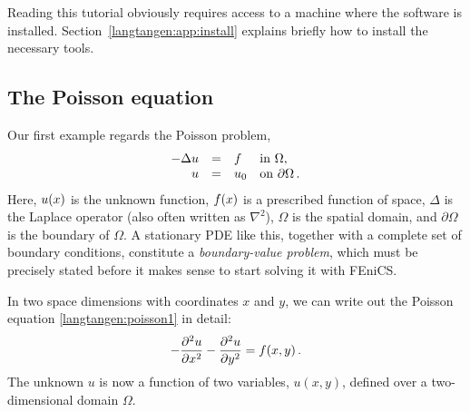 
Reading this tutorial obviously requires access to a machine where the
\fenics{} software
is installed. Section~\ref{langtangen:app:install} explains briefly how
to install the necessary tools.

\subsection{The Poisson equation}
\label{langtangen:poisson1:bvp}

Our first example regards the Poisson problem,
\begin{equation} \label{langtangen:poisson1}
  \begin{array}{rcll}
    - \Delta u &=& f &\mbox{in } \Omega, \\
    u &=& u_0 &\mbox{on } \partial \Omega\thinspace .
  \end{array}
\end{equation}
Here, $u({x})$ is the unknown function, $f({x})$ is a prescribed function
of space, $\Delta$  is the Laplace operator (also often written
as $\nabla^2$), $\Omega$ is the spatial domain, and $\partial\Omega$ is
the boundary of $\Omega$. A stationary PDE like this, together with a
complete set of boundary conditions, constitute a
\emph{boundary-value problem}, which must be precisely stated before
it makes sense to start solving it with FEniCS.

In two space dimensions
with coordinates $x$ and $y$, we can write out the Poisson equation
\eqref{langtangen:poisson1}
in detail:
\begin{equation}
- {\partial^2 u\over\partial x^2} -
{\partial^2 u\over\partial y^2} = f(x,y)\thinspace .
\end{equation}
The unknown $u$ is now a function of two variables, $u(x,y)$, defined
over a two-dimensional domain $\Omega$.

